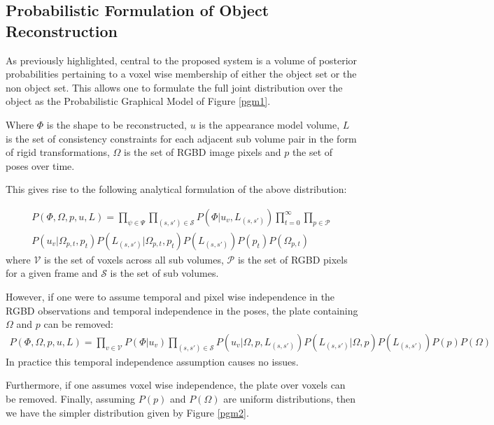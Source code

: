 \subsection{Probabilistic Formulation of Object Reconstruction}
As previously highlighted, central to the proposed system is a volume of posterior probabilities pertaining to a voxel wise membership of either the 
object set or the non object set. This allows one to formulate the full joint distribution over the object as the Probabilistic 
Graphical Model of Figure \ref{pgm1}.

Where $\Phi$ is the shape to be reconstructed, $u$ is the appearance model volume, $L$ is the 
set of consistency constraints for each adjacent sub volume pair in the form of rigid transformations, $\Omega$ is the set of 
RGBD image pixels and $p$ the set of poses over time.

This gives rise to the following analytical formulation of the above distribution:

\begin{equation}
\begin{split}
P(\Phi, \Omega, p, u, L) = 
\prod_{\psi \in \Psi}\prod_{(s, s') \in \mathcal{S}}P(\Phi|u_{v}, L_{(s, s')}) 
\prod_{t=0}^{\infty}\prod_{p \in \mathcal{P}}\\
P(u_{v}|\Omega_{p, t}, p_{t})
P(L_{(s, s')}|\Omega_{p, t}, p_{t})
P(L_{(s, s')})P(p_{t})P(\Omega_{p, t})
\end{split}
\end{equation}
where $\mathcal{V}$ is the set of voxels across all sub volumes, $\mathcal{P}$ is the set of RGBD pixels for a given 
frame and $\mathcal{S}$ is the set of sub volumes.

However, if one were to assume temporal and pixel wise independence in the RGBD observations and temporal independence in 
the poses, the plate containing $\Omega$ and $p$ can be removed:
\begin{equation}
\begin{split}
P(\Phi, \Omega, p, u, L) = 
\prod_{v \in \mathcal{V}}P(\Phi|u_{v})
\prod_{(s, s') \in \mathcal{S}}P(u_{v}|\Omega, p, L_{(s, s')})
P(L_{(s, s')}|\Omega, p) P(L_{(s, s')})P(p)P(\Omega)
\end{split}
\end{equation}
In practice this temporal independence assumption causes no issues.

Furthermore, if one assumes voxel wise independence, the plate over voxels can be removed. Finally, assuming $P(p)$ and 
$P(\Omega)$ are uniform distributions, then we have the simpler distribution given by Figure \ref{pgm2}.

